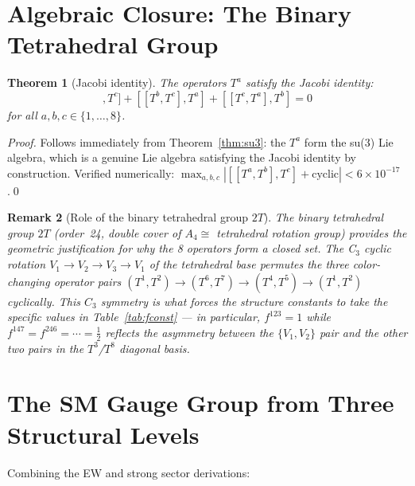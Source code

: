 \documentclass[11pt,a4paper]{article}
\newtheorem{theorem}{Theorem}[section]
\newtheorem{remark}[theorem]{Remark}
\begin{document}
\section{Algebraic Closure: The Binary Tetrahedral Group}

\begin{theorem}[Jacobi identity]
\label{thm:jacobi}
The operators $T^a$ satisfy the Jacobi identity:
\begin{equation}
[[T^a, T^b], T^c]
+ [[T^b, T^c], T^a]
+ [[T^c, T^a], T^b] = 0
\label{eq:jacobi}
\end{equation}
for all $a, b, c \in \{1,\ldots,8\}$.
\end{theorem}

\begin{proof}
Follows immediately from Theorem~\ref{thm:su3}: the $T^a$ form
the su(3) Lie algebra, which is a genuine Lie algebra satisfying
the Jacobi identity by construction.  Verified numerically:
$\max_{a,b,c}|[[T^a,T^b],T^c] + \text{cyclic}| < 6\times10^{-17}$
\citep{cpp_ss_mc}.\qed
\end{proof}

\begin{remark}[Role of the binary tetrahedral group $2T$]
The binary tetrahedral group $2T$ (order~24, double cover of
$A_4 \cong$ tetrahedral rotation group) provides the geometric
justification for why the 8 operators form a \emph{closed} set.
The C$_3$ cyclic rotation $V_1 \to V_2 \to V_3 \to V_1$ of the
tetrahedral base permutes the three color-changing operator pairs
$(T^1,T^2) \to (T^6,T^7) \to (T^4,T^5) \to (T^1,T^2)$ cyclically.
This $C_3$ symmetry is what forces the structure constants to take
the specific values in Table~\ref{tab:fconst} --- in particular,
$f^{123} = 1$ while $f^{147} = f^{246} = \cdots = \frac{1}{2}$
reflects the asymmetry between the $\{V_1,V_2\}$ pair and the
other two pairs in the $T^3$/$T^8$ diagonal basis.
\end{remark}

\section{The SM Gauge Group from Three Structural Levels}

Combining the EW and strong sector derivations:
\end{document}
